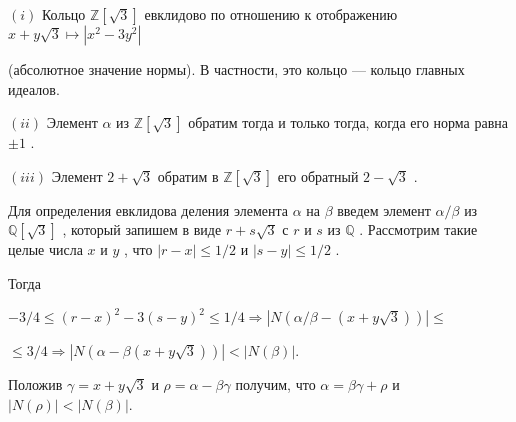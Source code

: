 \documentclass{mai_book}
\begin{document}
\begin{lemma}

$(i)$ Кольцо $\mathbb{Z}[\sqrt 3]$
 евклидово по отношению к отображению $x+y\sqrt 3\mapsto |x^2 - 3y^2|$
 
(абсолютное значение нормы). В частности, это кольцо — 
кольцо главных идеалов. 

$(ii)$ Элемент $\alpha$
 из $\mathbb{Z}[\sqrt 3]$
 обратим тогда и только тогда, когда его 
норма равна $\pm 1$
. 

$(iii)$ Элемент $2+\sqrt 3$
 обратим в $\mathbb{Z}[\sqrt 3]$
 его обратный $2-\sqrt 3$
 . 
\end{lemma}
\begin{myproof}
 Для определения евклидова деления элемента $\alpha$
 на $\beta$
 введем элемент 
$\alpha/\beta$
 из $\mathbb{Q}[\sqrt 3]$
 , который запишем в виде $r +s\sqrt 3$ с $r$ и $s$ из $\mathbb{Q}$ 
. Рассмотрим такие целые числа $x$
 и $y$
 , что $|r-x|\leqslant 1/2$ и $|s-y|\leqslant 1/2$
.

\newpage

Тогда 

\begin{center}
$-3/4 \leqslant (r-x)^2 - 3(s-y)^2 \leqslant 1/4\Rightarrow |N(\alpha/\beta - (x+y\sqrt 3))| \leqslant$

$\leqslant 3/4\Rightarrow |N(\alpha - \beta(x+y\sqrt 3))| < |N(\beta)|$.
\end{center}


Положив $\gamma = x +y\sqrt 3$ и $\rho = \alpha - \beta\gamma$
 получим, что $\alpha = \beta\gamma + \rho$
 и $|N(\rho)| < |N(\beta)|$.
\end{myproof}
\end{document}
